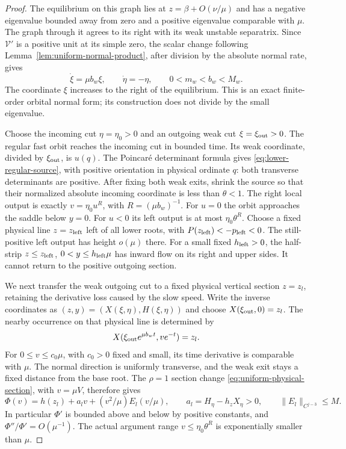 \begin{proof}
The equilibrium on this graph lies at $z=\beta+O(\nu/\mu)$ and
has a negative eigenvalue bounded away from zero and a positive eigenvalue
comparable with $\mu$. The graph through it agrees to its right with
its weak unstable separatrix. Since $\mathcal V'$ is a positive unit at its
simple zero, the scalar change following
Lemma~\ref{lem:uniform-normal-product}, after division by the absolute
normal rate, gives
\begin{equation}\label{eq:lower-product}
 \dot\xi=\mu b_w\xi,\qquad\dot\eta=-\eta,\qquad 0<m_w<b_w<M_w .
\end{equation}
The coordinate $\xi$ increases to the right of the equilibrium.
This is an exact finite-order orbital normal form; its construction
does not divide by the small eigenvalue.

Choose the incoming cut $\eta=\eta_0>0$ and an outgoing weak cut
$\xi=\xi_{\rm out}>0$. The regular fast orbit reaches the incoming
cut in bounded time. Its weak coordinate, divided by $\xi_{\rm out}$,
is $u(q)$. The Poincar\'e determinant formula gives
\eqref{eq:lower-regular-source}, with positive orientation in physical
ordinate $q$: both transverse determinants are positive. After fixing
both weak exits, shrink the source so that their normalized absolute
incoming coordinate is less than $\theta<1$. The right local output is
exactly $v=\eta_0u^R$, with $R=(\mu b_w)^{-1}$.
For $u=0$ the orbit approaches the saddle below $y=0$. For $u<0$ its
left output is at most $\eta_0\theta^R$. Choose a fixed physical line
$z=z_{\rm left}$ left of all lower roots, with
$P(z_{\rm left})<-p_{\rm left}<0$. The still-positive left output has
height $o(\mu)$ there. For a small fixed $h_{\rm left}>0$, the half-strip
$z\le z_{\rm left}$, $0<y\le h_{\rm left}\mu$ has inward flow on its
right and upper sides. It cannot return to the positive outgoing section.

We next transfer the weak outgoing cut to a fixed physical vertical
section $z=z_l$, retaining the derivative loss caused by the slow speed.
Write the inverse coordinates as
$(z,y)=(X(\xi,\eta),H(\xi,\eta))$ and choose
$X(\xi_{\rm out},0)=z_l$. The nearby occurrence on that physical line
is determined by
\[
 X(\xi_{\rm out}e^{\mu b_wt},ve^{-t})=z_l.
\]
For $0\le v\le c_0\mu$, with $c_0>0$ fixed and small, its time derivative
is comparable with $\mu$. The normal direction is uniformly transverse,
and the weak exit stays a fixed distance from the base root. The
$\rho=1$ section change \eqref{eq:uniform-physical-section}, with
$v=\mu V$, therefore gives
\begin{equation}\label{eq:lower-cut-change}
 \Phi(v)=h(z_l)+a_lv+(v^2/\mu)E_l(v/\mu),\qquad
 a_l=H_\eta-h_zX_\eta>0,\qquad \|E_l\|_{C^{j-3}}\le M.
\end{equation}
In particular $\Phi'$ is bounded above and below by positive constants,
and $\Phi''/\Phi'=O(\mu^{-1})$. The actual argument range
$v\le\eta_0\theta^R$ is exponentially smaller than $\mu$.


\end{proof}
